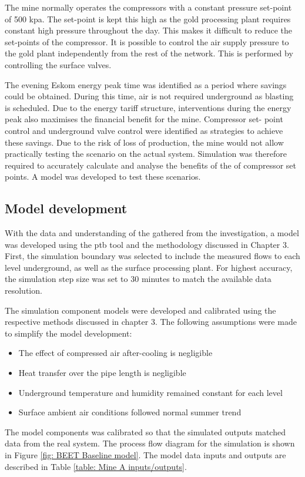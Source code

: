 \par 
 The mine normally operates the compressors with a constant pressure set-point of 500 \gls{kpa}. The set-point is kept this high as the gold processing plant requires constant high pressure throughout the day. This makes it difficult to reduce the set-points of the compressor. It is possible to control the air supply pressure to the gold plant independently from the rest of the network. This is performed by controlling the surface valves.
 \par 
  The evening Eskom energy peak time was identified as a period where savings could be obtained. During this time, air is not required underground as blasting is scheduled. Due to the energy tariff structure, interventions during the energy peak also maximises the financial benefit for the mine. Compressor set- point control and underground valve control were identified as strategies to achieve these savings. Due to the risk of loss of production, the mine would not allow practically testing the scenario on the actual system. Simulation was therefore required to accurately calculate and analyse the benefits of the of compressor set points. A model was developed to test these scenarios.

\subsection{Model development}
With the data and understanding of the gathered from the investigation, a model was developed using the \gls{ptb} tool and the methodology discussed in Chapter 3. First, the simulation boundary was selected to include the measured flows to each level underground, as well as the surface processing plant. For highest accuracy, the simulation step size was set to 30 minutes to match the available data resolution.
\par
The simulation component models were developed and calibrated using the respective methods discussed in chapter 3. The following assumptions were made to simplify the model development:
\begin{itemize}
	\item The effect of compressed air after-cooling is negligible
	\item Heat transfer over the pipe length is negligible
	\item Underground temperature and humidity remained constant for each level
	\item Surface ambient air conditions followed normal summer trend
\end{itemize} 
The model components was calibrated so that the simulated outputs matched data from the real system. The process flow diagram for the simulation is shown in Figure \ref{fig: BEET Baseline model}. The model data inputs and outputs are described in Table \ref{table: Mine A inputs/outputs}.

